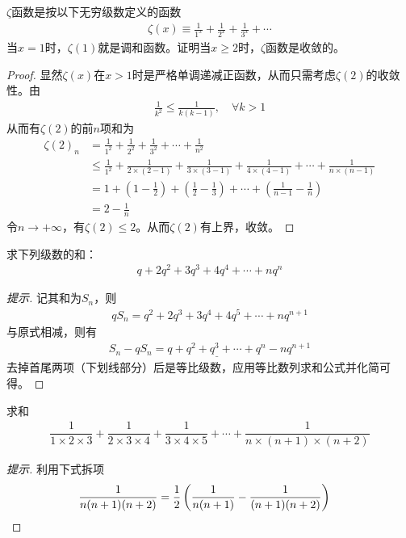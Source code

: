 \begin{example}[$\zeta$函数]
  $\zeta$函数是按以下无穷级数定义的函数
  \begin{align}
    \zeta(x)\equiv \frac1{1^x} + \frac1{2^x} + \frac1{3^x} + \cdots
  \end{align}
  当$x=1$时，$\zeta(1)$就是调和函数。证明当$x\ge2$时，$\zeta$函数是收敛的。
\end{example}
\begin{proof}
  显然$\zeta(x)$在$x>1$时是严格单调递减正函数，从而只需考虑$\zeta(2)$的收敛性。由
  \begin{align*}
    \frac1{k^2} \le \frac1{k(k-1)},\quad\forall k>1
  \end{align*}
  从而有$\zeta(2)$的前$n$项和为
  \begin{align*}
    \zeta(2)_n&=\frac1{1^2} + \frac1{2^2} + \frac1{3^2} + \cdots + \frac1{n^2}\\
            &\le \frac1{1^2} + \frac1{2\times(2-1)} + \frac1{3\times(3-1)} +\frac1{4\times(4-1)}+ \cdots + \frac1{n\times(n-1)}\\
            &= 1 + \left(1 - \frac12\right) + \left(\frac12 - \frac13\right) + \cdots + \left(\frac1{n-1}-\frac1n\right)\\
            &= 2 - \frac1n
  \end{align*}
  令$n\to+\infty$，有$\zeta(2)\le2$。从而$\zeta(2)$有上界，收敛。
\end{proof}

\begin{example}
  求下列级数的和：
  \begin{align*}
    q + 2q^2 + 3q^3 + 4q^4 + \cdots + nq^n
  \end{align*}
\end{example}
\begin{proof}[提示]
  记其和为$S_n$，则
  \begin{align*}
    qS_n = q^2 + 2q^3 + 3q^4 + 4q^5 + \cdots + nq^{n+1}
  \end{align*}
  与原式相减，则有
  \begin{align*}
    S_n - qS_n = \underline{q + q^2 + q^3 + \cdots + q^n} - nq^{n+1}
  \end{align*}
  去掉首尾两项（下划线部分）后是等比级数，应用等比数列求和公式并化简可得。
\end{proof}

\begin{example}
  求和
  \begin{align*}
    \dfrac1{1\times2\times3} + \dfrac1{2\times3\times4} + \dfrac1{3\times4\times5} + \cdots + \dfrac1{n\times(n+1)\times(n+2)}
  \end{align*}
\end{example}
\begin{proof}[提示]
  利用下式拆项
  \begin{align*}
    \frac1{n(n+1)(n+2)} = \frac12 \left(\frac1{n(n+1)} - \frac1{(n+1)(n+2)}\right)&\qedhere
  \end{align*}
\end{proof}


